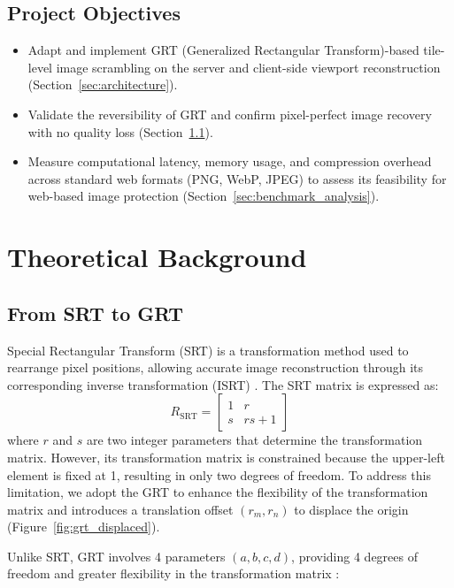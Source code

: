 \documentclass{article}
\begin{document}
\subsection{Project Objectives}

\begin{itemize}
    \item Adapt and implement GRT (Generalized Rectangular Transform)-based tile-level image scrambling on the server and client-side viewport reconstruction (Section~\ref{sec:architecture}).
    \item Validate the reversibility of GRT and confirm pixel-perfect image recovery with no quality loss (Section~\ref{sec:GRT}).
    \item Measure computational latency, memory usage, and compression overhead across standard web formats (PNG, WebP, JPEG) to assess its feasibility for web-based image protection (Section~\ref{sec:benchmark_analysis}).
\end{itemize}

\section{Theoretical Background}
\subsection{From SRT to GRT}
\label{sec:GRT}

Special Rectangular Transform (SRT) is a transformation method used to rearrange pixel positions, allowing accurate image reconstruction through its corresponding inverse transformation (ISRT) \cite{Lan2025ANM}. The SRT matrix is expressed as:
\begin{equation}
R_{\mathrm{SRT}} =
\begin{bmatrix}
        1 & r \\
        s & rs+1
    \end{bmatrix}
\label{eq:srt}
\end{equation}
\noindent where \(r\) and \(s\) are two integer parameters that determine the transformation matrix. However, its transformation matrix is constrained because the upper-left element is fixed at 1, resulting in only two degrees of freedom. To address this limitation, we adopt the GRT to enhance the flexibility of the transformation matrix and introduces a translation offset $(r_m, r_n)$ to displace the origin (Figure~\ref{fig:grt_displaced}).



Unlike SRT, GRT involves 4 parameters \((a,b,c,d)\), providing 4 degrees of freedom and greater flexibility in the transformation matrix \cite{Lan2025ANM}:
\end{document}
